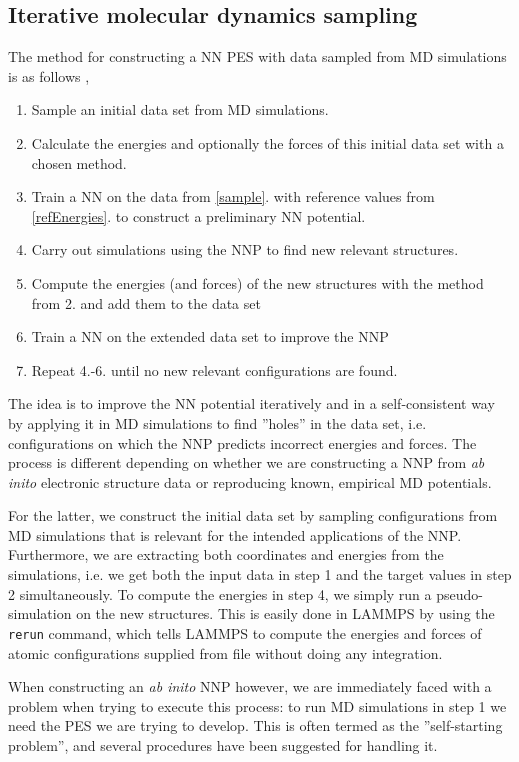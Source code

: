 \documentclass[twoside,english]{uiofysmaster}
\begin{document}
\subsection{Iterative molecular dynamics sampling} \label{sec:iterativeMDsampling}
The method for constructing a NN PES with data sampled from MD simulations is as follows \cite{Behler11general}
\cite{Raff12},
\begin{enumerate}
 \item Sample an initial data set from MD simulations. \label{sample} 
 \item Calculate the energies and optionally the forces of this initial data set with a chosen method. \label{refEnergies}
 \item Train a NN on the data from \ref{sample}. with reference values from \ref{refEnergies}. to
 construct a preliminary NN potential.
 \item Carry out simulations using the NNP to find new relevant structures. 
 \item Compute the energies (and forces) of the new structures with the method from 2. and add them to the data set
 \item Train a NN on the extended data set to improve the NNP
 \item Repeat 4.-6. until no new relevant configurations are found. 
  \label{NNPalgorithm}
\end{enumerate}
The idea is to improve the NN potential iteratively and in a self-consistent 
way by applying it in MD simulations to find 
''holes'' in the data set, i.e. configurations on which the NNP predicts incorrect energies and forces. The process
is different depending on whether we are constructing a NNP from \textit{ab inito} electronic structure data
or reproducing known, empirical MD potentials. 

For the latter, we construct the initial data set by sampling configurations from MD simulations that is relevant
for the intended applications of the NNP. Furthermore, we are extracting both coordinates and energies from the simulations, i.e.
we get both the input data in step 1 and the target values in step 2 simultaneously. To compute the energies in
step 4, we simply run a pseudo-simulation on the new structures. This is easily done in LAMMPS by using 
the \texttt{rerun} command, which tells LAMMPS to compute the energies and forces of atomic configurations 
supplied from file without doing any integration. 

When constructing an \textit{ab inito} NNP however, we are immediately faced with a problem when trying to execute this process: 
to run MD simulations in step 1 we need the PES we are trying to develop. 
This is often termed as the ''self-starting problem'', 
and several procedures have been suggested for handling it. 
\end{document}
